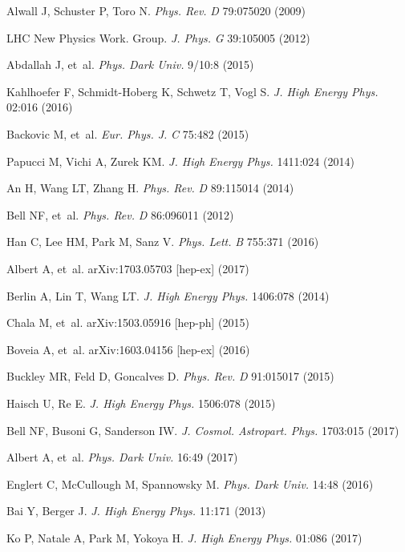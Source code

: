 \documentclass{ar-1col}
\begin{document}
\begin{thebibliography}{175}
Alwall J, Schuster P, Toro N. \textit{Phys. Rev.} \textit{D} 79:075020
(2009)

{LHC New Physics Work. Group}. \textit{J. Phys.} \textit{G} 39:105005
(2012)

Abdallah J, et~al. \textit{Phys. Dark Univ.} 9/10:8 (2015)

Kahlhoefer F, Schmidt-Hoberg K, Schwetz T, Vogl S. \textit{J. High Energy Phys.}
02:016 (2016)

Backovic M, et~al. \textit{Eur. Phys. J.} \textit{C} 75:482 (2015)

Papucci M, Vichi A, Zurek KM. \textit{J. High Energy Phys.} 1411:024 (2014)

An H, Wang LT, Zhang H. \textit{Phys. Rev.} \textit{D} 89:115014 (2014)

Bell NF, et~al. \textit{Phys. Rev.} \textit{D} 86:096011 (2012)

Han C, Lee HM, Park M, Sanz V. \textit{Phys. Lett.} \textit{B} 755:371
(2016)

Albert A, et~al. arXiv:1703.05703 [hep-ex] (2017)

Berlin A, Lin T, Wang LT. \textit{J. High Energy Phys.} 1406:078 (2014)

Chala M, et~al. arXiv:1503.05916 [hep-ph] (2015)

Boveia A, et~al. arXiv:1603.04156 [hep-ex] (2016)

Buckley MR, Feld D, Goncalves D. \textit{Phys. Rev.} \textit{D} 91:015017
(2015)

Haisch U, Re E. \textit{J. High Energy Phys.} 1506:078 (2015)

Bell NF, Busoni G, Sanderson IW. \textit{J. Cosmol. Astropart. Phys.} 1703:015 (2017)

Albert A, et~al. \textit{Phys. Dark Univ.} 16:49 (2017)

Englert C, McCullough M, Spannowsky M. \textit{Phys. Dark Univ.}
14:48 (2016)

Bai Y, Berger J. \textit{J. High Energy Phys.} 11:171 (2013)

Ko P, Natale A, Park M, Yokoya H. \textit{J. High Energy Phys.} 01:086 (2017)


\end{thebibliography}
\end{document}
